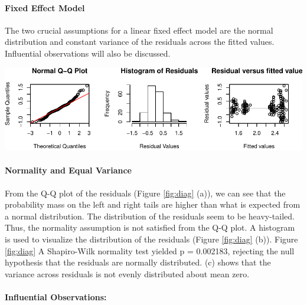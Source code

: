 \documentclass[]{article}
\let\oldparagraph\paragraph
\renewcommand{\paragraph}[1]{\oldparagraph{#1}\mbox{}}
\let\origfigure\figure
\let\endorigfigure\endfigure
\renewenvironment{figure}[1][2] {
    \expandafter\origfigure\expandafter[H]
} {
    \endorigfigure
}
\begin{document}
\hypertarget{fixed-effect-model}{%
\paragraph{Fixed Effect Model}\label{fixed-effect-model}}

The two crucial assumptions for a linear fixed effect model are the normal distribution and constant variance of the residuals across the fitted values. Influential observations will also be discussed.

\begin{figure}
\centering
\includegraphics{team6_final_project_3_files/figure-latex/diag-1.pdf}
\caption{\label{fig:diag}Visual diagnostics of Fixed Effect model assumptions. (a). Normal Q-Q plot of residuals. (b) Histogram of model residuals. (c) Residuals-versus-fitted value scatter plot.}
\end{figure}

\hypertarget{normality-and-equal-variance}{%
\paragraph{Normality and Equal Variance}\label{normality-and-equal-variance}}

From the Q-Q plot of the residuals (Figure \ref{fig:diag} (a)), we can see that the probability mass on the left and right tails are higher than what is expected from a normal distribution. The distribution of the residuals seem to be heavy-tailed. Thus, the normality assumption is not satisfied from the Q-Q plot. A histogram is used to visualize the distribution of the residuals (Figure \ref{fig:diag} (b)). Figure \ref{fig:diag} A Shapiro-Wilk normality test yielded p = 0.002183, rejecting the null hypothesis that the residuals are normally distributed. (c) shows that the variance across residuals is not evenly distributed about mean zero.

\hypertarget{influential-observations}{%
\paragraph{Influential Observations:}\label{influential-observations}}
\end{document}
